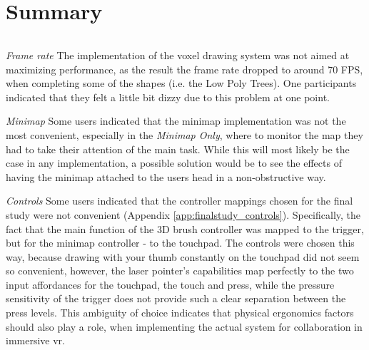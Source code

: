 
\chapter{Summary}



\subparagraph[Future work]{}
\textit{Frame rate} The implementation of the voxel drawing system was not aimed at maximizing performance, as the result the frame rate dropped to around 70 FPS, when completing some of the shapes (i.e. the Low Poly Trees). One participants indicated that they felt a little bit dizzy due to this problem at one point.

\textit{Minimap} Some users indicated that the minimap implementation was not the most convenient, especially in the \textit{Minimap Only}, where to monitor the map they had to take their attention of the main task. While this will most likely be the case in any implementation, a possible solution would be to see the effects of having the minimap attached to the users head in a non-obstructive way.

\textit{Controls} Some users indicated that the controller mappings chosen for the final study were not convenient (Appendix \ref{app:finalstudy_controls}). Specifically, the fact that the main function of the 3D brush controller was mapped to the trigger, but for the minimap controller - to the touchpad. The controls were chosen this way, because drawing with your thumb constantly on the touchpad did not seem so convenient, however, the laser pointer's capabilities map perfectly to the two input affordances for the touchpad, the touch and press, while the pressure sensitivity of the trigger does not provide such a clear separation between the press levels. This ambiguity of choice indicates that physical ergonomics factors should also play a role, when implementing the actual system for collaboration in immersive \gls{vr}.

